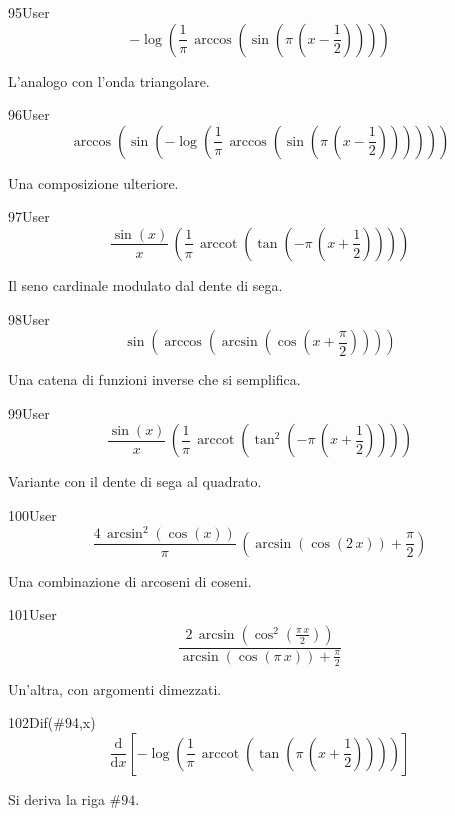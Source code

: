 \begin{espr}{95}{User}{}
\[
-\log\!\left(\frac{1}{\pi}\, \arccos\!\left(\sin\!\left(\pi\, \left(x - \frac{1}{2}\right)\right)\right)\right)
\]
\end{espr}
L'analogo con l'onda triangolare.

\begin{espr}{96}{User}{}
\[
\arccos\!\left(\sin\!\left(-\log\!\left(\frac{1}{\pi}\, \arccos\!\left(\sin\!\left(\pi\, \left(x - \frac{1}{2}\right)\right)\right)\right)\right)\right)
\]
\end{espr}
Una composizione ulteriore.

\begin{espr}{97}{User}{}
\[
\frac{\sin\!\left(x\right)}{x}\, \left(\frac{1}{\pi}\, \operatorname{arccot}\!\left(\tan\!\left(-\pi\, \left(x + \frac{1}{2}\right)\right)\right)\right)
\]
\end{espr}
Il seno cardinale modulato dal dente di sega.

\begin{espr}{98}{User}{}
\[
\sin\!\left(\arccos\!\left(\arcsin\!\left(\cos\!\left(x + \frac{\pi}{2}\right)\right)\right)\right)
\]
\end{espr}
Una catena di funzioni inverse che si semplifica.

\begin{espr}{99}{User}{}
\[
\frac{\sin\!\left(x\right)}{x}\, \left(\frac{1}{\pi}\, \operatorname{arccot}\!\left(\tan^{2}\!\left(-\pi\, \left(x + \frac{1}{2}\right)\right)\right)\right)
\]
\end{espr}
Variante con il dente di sega al quadrato.

\begin{espr}{100}{User}{}
\[
\frac{4\, \arcsin^{2}\!\left(\cos\!\left(x\right)\right)}{\pi}\, \left(\arcsin\!\left(\cos\!\left(2\, x\right)\right) + \frac{\pi}{2}\right)
\]
\end{espr}
Una combinazione di arcoseni di coseni.

\begin{espr}{101}{User}{}
\[
\frac{2\, \arcsin\!\left(\cos^{2}\!\left(\frac{\pi\, x}{2}\right)\right)}{\arcsin\!\left(\cos\!\left(\pi\, x\right)\right) + \frac{\pi}{2}}
\]
\end{espr}
Un'altra, con argomenti dimezzati.

\begin{espr}{102}{Dif(\#94,x)}{}
\[
\frac{\mathrm{d}}{\mathrm{d}x}\!\left[-\log\!\left(\frac{1}{\pi}\, \operatorname{arccot}\!\left(\tan\!\left(\pi\, \left(x + \frac{1}{2}\right)\right)\right)\right)\right]
\]
\end{espr}
Si deriva la riga $\#94$.

